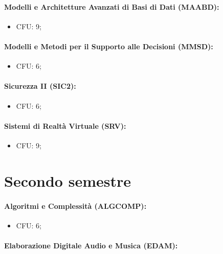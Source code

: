 \paragraph{Modelli e Architetture Avanzati di Basi
di Dati (MAABD):}

\begin{itemize}
  \item CFU: 9;
\end{itemize}

\paragraph{Modelli e Metodi per il Supporto alle Decisioni (MMSD):}

\begin{itemize}
  \item CFU: 6;
\end{itemize}

\paragraph{Sicurezza II (SIC2):}

\begin{itemize}
  \item CFU: 6;
\end{itemize}

\paragraph{Sistemi di Realtà Virtuale (SRV):}

\begin{itemize}
  \item CFU: 9;
\end{itemize}

\section{Secondo semestre}

\paragraph{Algoritmi e Complessità (ALGCOMP):}

\begin{itemize}
  \item CFU: 6;
\end{itemize}

\paragraph{Elaborazione Digitale Audio e Musica (EDAM):}

